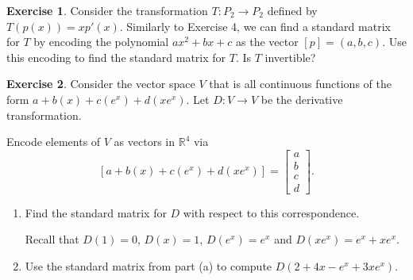 \documentclass{beamer}
\newcommand{\R}{\mathbb{R}}
\newcommand{\fn}{\insertframenumber}
\theoremstyle{definition}
\newtheorem{exercise}{Exercise}
\begin{document}
\begin{frame}{\fn}
	\begin{exercise}
		Consider the transformation $T:P_2\to P_2$ defined by $T(p(x))=xp'(x)$.  Similarly to Exercise 4, we can find a standard matrix for $T$ by encoding the polynomial $ax^2+bx+c$ as the vector $[p]=(a,b,c)$.  Use this encoding to find the standard matrix for $T$.  Is $T$ invertible?
	\end{exercise}
\end{frame}
\begin{frame}{\fn}
	\begin{exercise}
		Consider the vector space $V$ that is all continuous functions of the form $a+b(x)+c(e^x)+d(xe^x)$.  Let $D:V\to V$ be the derivative transformation.  
		
		Encode elements of $V$ as vectors in $\R^4$ via \[[a+b(x)+c(e^x)+d(xe^x)] = \begin{bmatrix}a\\b\\c\\d\end{bmatrix}.\]
		
		\begin{enumerate}[label=(\alph*)]
			\item Find the standard matrix for $D$ with respect to this correspondence.
		
			Recall that $D(1)=0$, $D(x)=1$, $D(e^x)=e^x$ and $D(xe^x)=e^x+xe^x$.
			\item Use the standard matrix from part (a) to compute $D(2+4x-e^x+3xe^x)$.
		\end{enumerate}
		
		
	\end{exercise}
\end{frame}
\end{document}

